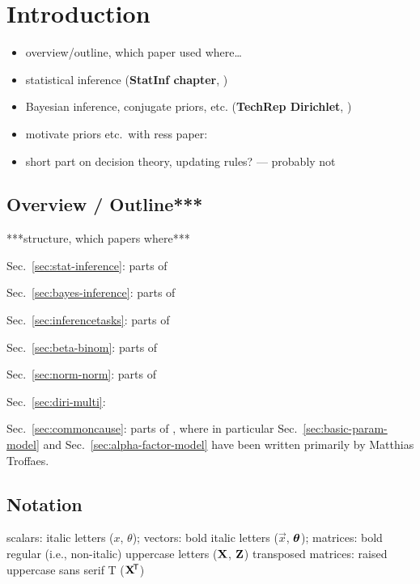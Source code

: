 \chapter{Introduction}


\begin{itemize}
\item overview/outline, which paper used where\ldots
\item statistical inference (\textbf{StatInf chapter}, \cite{itip-statinf})
\item Bayesian inference, conjugate priors, etc. (\textbf{TechRep Dirichlet}, \cite{Walter2012b})
\item motivate priors etc.\ with ress paper: \cite{Troffaes2013a}
\item short part on decision theory, updating rules? --- probably not
\end{itemize}

\section{Overview / Outline***}

***structure, which papers where***

Sec.~\ref{sec:stat-inference}: parts of \cite{itip-statinf}

Sec.~\ref{sec:bayes-inference}: parts of \cite{itip-statinf}

Sec.~\ref{sec:inferencetasks}: parts of \cite{itip-statinf}

Sec.~\ref{sec:beta-binom}: parts of \cite{itip-statinf}

Sec.~\ref{sec:norm-norm}: parts of \cite{itip-statinf}

Sec.~\ref{sec:diri-multi}: \cite{Walter2012b}

Sec.~\ref{sec:commoncause}: parts of \cite{Troffaes2013a},
where in particular Sec.~\ref{sec:basic-param-model} and Sec.~\ref{sec:alpha-factor-model}
have been written primarily by Matthias Troffaes.


\section{Notation}
\label{sec:notation}

scalars: italic letters ($x$, $\theta$);
vectors: bold italic letters ($\vec{x}$, $\boldsymbol{\theta}$);
matrices: bold regular (i.e., non-italic) uppercase letters ($\mathbf{X}$, $\mathbf{Z}$)
transposed matrices: raised uppercase sans serif T ($\mathbf{X}^{{\mbox{\!\scriptsize\textsf{T}}}}$)

